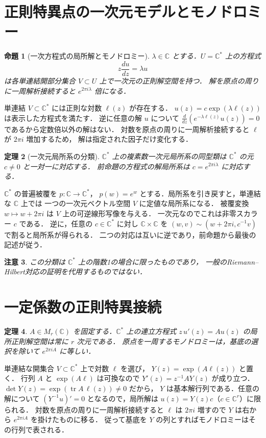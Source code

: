 \documentclass[a5paper,10pt,onecolumn]{jsarticle}
\makeatletter
\theoremstyle{mathnotetheorem}
\newtheorem{theorem}{定理}[section]
\newtheorem{proposition}[theorem]{命題}
\newtheorem{remark}[theorem]{注意}
\renewcommand{\proofname}{証明}
\renewenvironment{proof}[1][\proofname]{%
  \par\pushQED{\qed}\normalfont\topsep4\p@\@plus2\p@\relax
  \trivlist\item[\hskip\labelsep\bfseries #1]\ignorespaces
}{\popQED\endtrivlist\@endpefalse}
\makeatother
\begin{document}
\section{正則特異点の一次元モデルとモノドロミー}
\begin{proposition}[一次方程式の局所解とモノドロミー]
$\lambda\in\mathbb C$ とする．$U=\mathbb C^*$ 上の方程式
\[
 z\frac{du}{dz}=\lambda u
\]
は各単連結開部分集合 $V\subset U$ 上で一次元の正則解空間を持つ．
解を原点の周りに一周解析接続すると $e^{2\pi i\lambda}$ 倍になる．
\end{proposition}
\begin{proof}
単連結 $V\subset\mathbb C^*$ には正則な対数 $\ell(z)$ が存在する．
$u(z)=c\exp(\lambda\ell(z))$ は表示した方程式を満たす．
逆に任意の解 $u$ について
$\frac{d}{dz}(e^{-\lambda\ell(z)}u(z))=0$ であるから定数倍以外の解はない．
対数を原点の周りに一周解析接続すると $\ell$ が $2\pi i$ 増加するため，
解は指定された因子だけ変化する．
\end{proof}
\begin{theorem}[一次元局所系の分類]
$\mathbb C^*$ 上の複素数一次元局所系の同型類は
$\mathbb C^*$ の元 $c\ne0$ と一対一に対応する．
前命題の方程式の解局所系は $c=e^{2\pi i\lambda}$ に対応する．
\end{theorem}
\begin{proof}
$\mathbb C^*$ の普遍被覆を $p:\mathbb C\to\mathbb C^*$，
$p(w)=e^w$ とする．局所系を引き戻すと，単連結な $\mathbb C$ 上では
一つの一次元ベクトル空間 $V$ に定値な局所系になる．
被覆変換 $w\mapsto w+2\pi i$ は $V$ 上の可逆線形写像を与える．
一次元なのでこれは非零スカラー $c$ である．
逆に，任意の $c\in\mathbb C^*$ に対し
$\mathbb C\times\mathbb C$ を
$(w,v)\sim(w+2\pi i,c^{-1}v)$ で割ると局所系が得られる．
二つの対応は互いに逆であり，前命題から最後の記述が従う．
\end{proof}
\begin{remark}
この分類は $\mathbb C^*$ 上の階数1の場合に限ったものであり，
一般のRiemann--Hilbert対応の証明を代用するものではない．
\end{remark}
\section{一定係数の正則特異接続}
\begin{theorem}
$A\in M_r(\mathbb C)$ を固定する．$\mathbb C^*$ 上の連立方程式
$z\,u'(z)=Au(z)$ の局所正則解空間は常に $r$ 次元である．
原点を一周するモノドロミーは，基底の選択を除いて
$e^{2\pi iA}$ に等しい．
\end{theorem}
\begin{proof}
単連結な開集合 $V\subset\mathbb C^*$ 上で対数 $\ell$ を選び，
$Y(z)=\exp(A\ell(z))$ と置く．
行列 $A$ と $\exp(A\ell)$ は可換なので
$Y'(z)=z^{-1}AY(z)$ が成り立つ．
$\det Y(z)=\exp(\operatorname{tr}A\,\ell(z))\ne0$ だから，
$Y$ は基本解行列である．任意の解について
$(Y^{-1}u)'=0$ となるので，局所解は $u(z)=Y(z)c$（$c\in\mathbb C^r$）に限られる．
対数を原点の周りに一周解析接続すると $\ell$ は $2\pi i$ 増すので
$Y$ は右から $e^{2\pi iA}$ を掛けたものに移る．
従って基底を $Y$ の列とすればモノドロミーはその行列で表される．
\end{proof}
\end{document}
